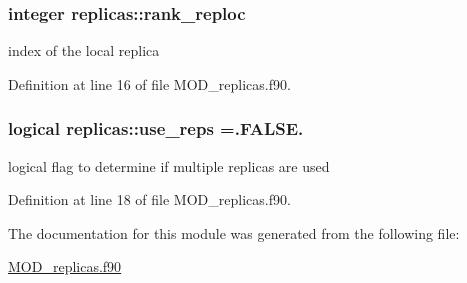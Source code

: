 \hypertarget{classreplicas_ae968ad9408fdb3603acb8070a164aa7a}{
\subsubsection[{rank\-\_\-reploc}]{\setlength{\rightskip}{0pt plus 5cm}integer replicas\-::rank\-\_\-reploc}}\label{classreplicas_ae968ad9408fdb3603acb8070a164aa7a}


index of the local replica 



Definition at line 16 of file M\-O\-D\-\_\-replicas.\-f90.

\hypertarget{classreplicas_ad61522409fd682821e32815718631e59}{
\subsubsection[{use\-\_\-reps}]{\setlength{\rightskip}{0pt plus 5cm}logical replicas\-::use\-\_\-reps =.F\-A\-L\-S\-E.}}\label{classreplicas_ad61522409fd682821e32815718631e59}


logical flag to determine if multiple replicas are used 



Definition at line 18 of file M\-O\-D\-\_\-replicas.\-f90.



The documentation for this module was generated from the following file\-:\begin{DoxyCompactItemize}
\item 
\hyperlink{MOD__replicas_8f90}{M\-O\-D\-\_\-replicas.\-f90}\end{DoxyCompactItemize}
